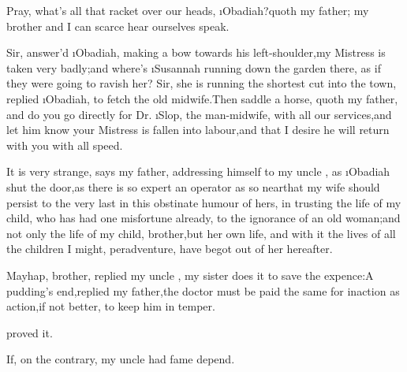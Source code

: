 \documentclass[twoside]{article}
\begin{document}
Pray, what’s all that racket over our heads,
\i{Obadiah?}\tsk quoth my father;\tsk\break
my brother and I can scarce hear ourselves speak.

Sir, answer’d \i{Obadiah}, making a bow
towards his left-shoulder,\tsk my Mistress
is taken very badly;\tsk and where’s \i{Susannah}
running down the garden there,
as if they were going to ravish her?\tsh\break
Sir, she is running the shortest cut into the town, replied
\i{Obadiah}, to fetch the old midwife.\tsh Then saddle a
horse, quoth my father, and do you go direct\-ly for Dr.\@
\i{Slop}, the man-midwife, with all our services,\tsk and
let him know your Mistress is fallen into labour,\tsk and that I
desire he will return with you with all speed.

It is very strange, says my father, addressing himself to my
uncle \toby, as \i{Obadiah} shut the door,\tsh as
there is so expert an operator as \drslop so
near\tsk\break that my wife should persist to the very last in
this obstinate humour of hers, in trusting the life of my child,
who has had one misfortune already, to the ignorance of an old
woman;\tsh and not only the life of my child, brother,\tsh but
her own
life, and with it the lives of all the children I might,
peradventure, have begot out of her hereafter.

Mayhap, brother, replied my uncle\break
\toby, my sister does it to save the expence:\tsk A
pudding’s end,\tsk replied my father,\tsh the doctor must be
paid the same for inaction as action,\tsk if not better,\tsk
to keep him in temper.

\noindent
{}
proved it.

If, on the contrary, my uncle \toby had 
fame depend.
\end{document}
